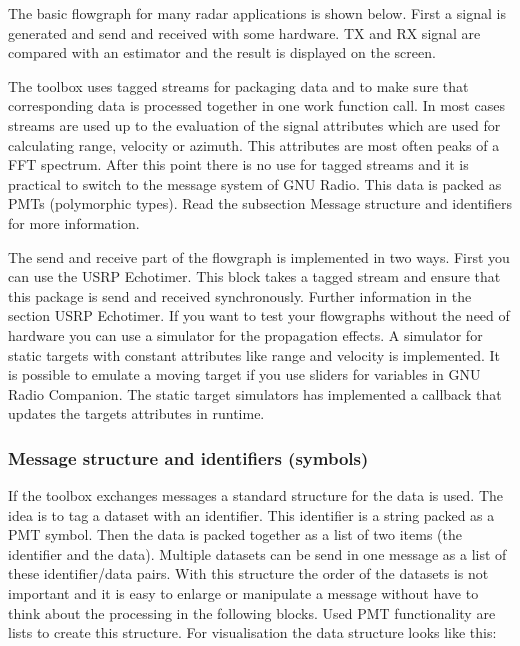 The basic flowgraph for many radar applications is shown below. First a signal is generated and send and received with some hardware. TX and RX signal are compared with an estimator and the result is displayed on the screen.

The toolbox uses tagged streams for packaging data and to make sure that corresponding data is processed together in one work function call. In most cases streams are used up to the evaluation of the signal attributes which are used for calculating range, velocity or azimuth. This attributes are most often peaks of a F\+FT spectrum. After this point there is no use for tagged streams and it is practical to switch to the message system of G\+NU Radio. This data is packed as P\+M\+Ts (polymorphic types). Read the subsection \textquotesingle{}Message structure and identifiers\textquotesingle{} for more information.

The send and receive part of the flowgraph is implemented in two ways. First you can use the U\+S\+RP Echotimer. This block takes a tagged stream and ensure that this package is send and received synchronously. Further information in the section \textquotesingle{}U\+S\+RP Echotimer\textquotesingle{}. If you want to test your flowgraphs without the need of hardware you can use a simulator for the propagation effects. A simulator for static targets with constant attributes like range and velocity is implemented. It is possible to emulate a moving target if you use sliders for variables in G\+NU Radio Companion. The static target simulators has implemented a callback that updates the targets attributes in runtime.

\subsubsection{Message structure and identifiers (symbols)}\label{index_msg}
If the toolbox exchanges messages a standard structure for the data is used. The idea is to tag a dataset with an identifier. This identifier is a string packed as a P\+MT symbol. Then the data is packed together as a list of two items (the identifier and the data). Multiple datasets can be send in one message as a list of these identifier/data pairs. With this structure the order of the datasets is not important and it is easy to enlarge or manipulate a message without have to think about the processing in the following blocks. Used P\+MT functionality are lists to create this structure. For visualisation the data structure looks like this\+:

